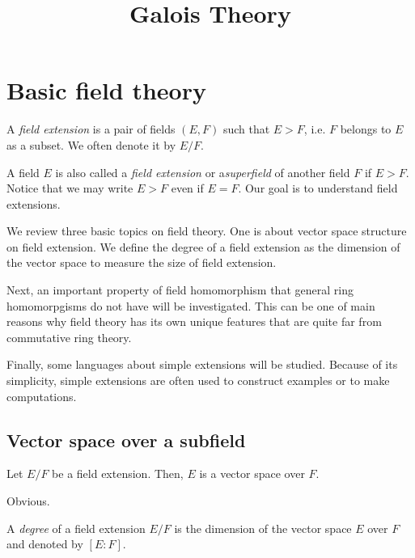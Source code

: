 \documentclass{../exp}
\title{Galois Theory}
\begin{document}
\maketitle
\tableofcontents








\section{Basic field theory}
\begin{defn}
A \emph{field extension} is a pair of fields $(E,F)$ such that $E>F$, i.e. $F$ belongs to $E$ as a subset.
We often denote it by $E/F$.
\end{defn}
A field $E$ is also called a \emph{field extension} or a\emph{superfield} of another field $F$ if $E>F$.
Notice that we may write $E>F$ even if $E=F$.
Our goal is to understand field extensions.

We review three basic topics on field theory.
One is about vector space structure on field extension.
We define the degree of a field extension as the dimension of the vector space to measure the size of field extension.

Next, an important property of field homomorphism that general ring homomorpgisms do not have will be investigated.
This can be one of main reasons why field theory has its own unique features that are quite far from commutative ring theory.

Finally, some languages about simple extensions will be studied.
Because of its simplicity, simple extensions are often used to construct examples or to make computations.

\subsection{Vector space over a subfield}

\begin{thm}
Let $E/F$ be a field extension.
Then, $E$ is a vector space over $F$.
\end{thm}
\begin{pf}
Obvious.
\end{pf}

\begin{defn}
A \emph{degree} of a field extension $E/F$ is the dimension of the vector space $E$ over $F$ and denoted by $[E:F]$.
\end{defn}
\end{document}
